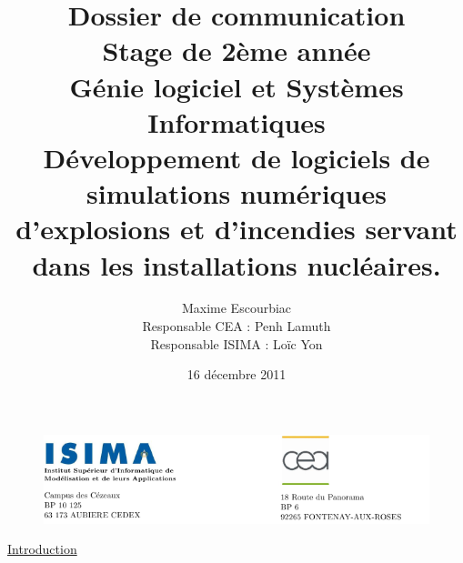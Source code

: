 \documentclass[a4paper,11pt]{article}
\renewcommand{\thepage}{}
\begin{document}
\begin{figure}
   \includegraphics[scale = 0.75]{HeaderPagedeGarde.PNG}
\end{figure}




\author{Maxime Escourbiac \\ Responsable CEA : Penh Lamuth \\ Responsable ISIMA : Loïc Yon}
\title{
  Dossier de communication \\ Stage de 2ème année \\ Génie logiciel et Systèmes Informatiques \\
  \bigskip
   \large{
      Développement de logiciels de simulations numériques d'explosions et d'incendies servant dans les installations nucléaires.
   }
}
\date{16 décembre 2011}
\maketitle

\newpage

\tableofcontents
\newpage

\renewcommand{\thepage}{\arabic{page}}
\setcounter{page}{1}

\begin{flushleft}
\LARGE{ \underline{Introduction}\bigskip}
\end{flushleft}
\end{document}
